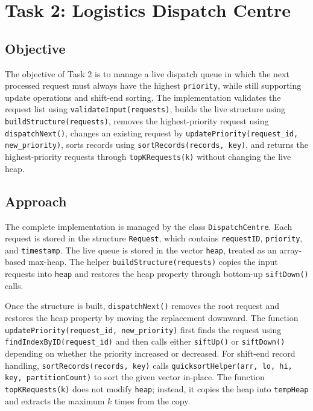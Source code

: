 \documentclass[10pt,a4paper]{article}
\begin{document}
\section{Task 2: Logistics Dispatch Centre}

\subsection{Objective}
The objective of Task 2 is to manage a live dispatch queue in which the next processed request must always have the highest \texttt{priority}, while still supporting update operations and shift-end sorting. The implementation validates the request list using \texttt{validateInput(requests)}, builds the live structure using \texttt{buildStructure(requests)}, removes the highest-priority request using \texttt{dispatchNext()}, changes an existing request by \texttt{updatePriority(request\_id, new\_priority)}, sorts records using \texttt{sortRecords(records, key)}, and returns the highest-priority requests through \texttt{topKRequests(k)} without changing the live heap.

\subsection{Approach}
The complete implementation is managed by the class \texttt{DispatchCentre}. Each request is stored in the structure \texttt{Request}, which contains \texttt{requestID}, \texttt{priority}, and \texttt{timestamp}. The live queue is stored in the vector \texttt{heap}, treated as an array-based max-heap. The helper \texttt{buildStructure(requests)} copies the input requests into \texttt{heap} and restores the heap property through bottom-up \texttt{siftDown()} calls.

Once the structure is built, \texttt{dispatchNext()} removes the root request and restores the heap property by moving the replacement downward. The function \texttt{updatePriority(request\_id, new\_priority)} first finds the request using \texttt{findIndexByID(request\_id)} and then calls either \texttt{siftUp()} or \texttt{siftDown()} depending on whether the priority increased or decreased. For shift-end record handling, \texttt{sortRecords(records, key)} calls \texttt{quicksortHelper(arr, lo, hi, key, partitionCount)} to sort the given vector in-place. The function \texttt{topKRequests(k)} does not modify \texttt{heap}; instead, it copies the heap into \texttt{tempHeap} and extracts the maximum \(k\) times from the copy.
\end{document}
